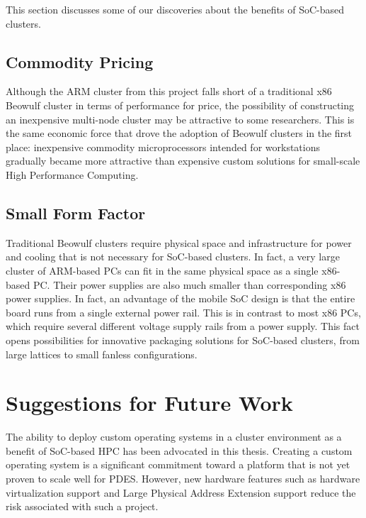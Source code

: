 \documentclass[11pt]{book}
\begin{document}
This section discusses some of our discoveries about the benefits of SoC-based clusters.

\subsection{Commodity Pricing}

Although the ARM cluster from this project falls short of a traditional x86 Beowulf
cluster in terms of performance for price, the possibility of constructing an inexpensive
multi-node cluster may be attractive to some researchers.  This is the same economic force
that drove the adoption of Beowulf clusters in the first place: inexpensive commodity
microprocessors intended for workstations gradually became more attractive than expensive
custom solutions for small-scale High Performance Computing.

\subsection{Small Form Factor}

Traditional Beowulf clusters require physical space and infrastructure for power and
cooling that is not necessary for SoC-based clusters.  In fact, a very large cluster of
ARM-based PCs can fit in the same physical space as a single x86-based PC.  Their power
supplies are also much smaller than corresponding x86 power supplies.  In fact, an
advantage of the mobile SoC design is that the entire board runs from a single external
power rail.  This is in contrast to most x86 PCs, which require several different voltage
supply rails from a power supply.  This fact opens possibilities for innovative packaging
solutions for SoC-based clusters, from large lattices to small fanless configurations.

\section{Suggestions for Future Work}

The ability to deploy custom operating systems in a cluster environment as a benefit of
SoC-based HPC has been advocated in this thesis.  Creating a custom operating system is a
significant commitment toward a platform that is not yet proven to scale well for PDES.
However, new hardware features such as hardware virtualization support and Large Physical
Address Extension support reduce the risk associated with such a project.

\end{document}
